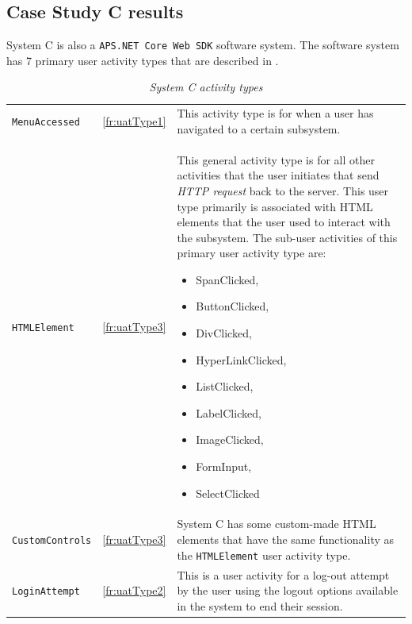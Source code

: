 \clearpage

\subsection{Case Study C results}\label{sec:ch3_csC}
System C is also a \texttt{APS.NET Core Web SDK} software system. The software system has 7 primary user activity types that are described in .

\begin{table}[!htb]
	\centering
	\caption[System A activity types]{\textit{System C activity types}}
	\label{tbl:ch3_systemCActivityTypes}
	\begin{tabularx}{\textwidth}{llX}
		\toprule
		\thead{Activity} & \thead{Functional requirement} & \thead{Description} \\
		\midrule
		\rowcolor{lightgray}
		\texttt{MenuAccessed} & \ref{fr:uatType1} & \RaggedRight This activity type is for when a user has navigated to a certain subsystem. \\ 
		\texttt{HTMLElement} & \ref{fr:uatType3} & \RaggedRight This general activity type is for all other activities that the user initiates that send \textit{HTTP request} back to the server. This user type primarily is associated with HTML elements that the user used to interact with the subsystem. The sub-user activities of this primary user activity type are: \begin{itemize}
			\item SpanClicked,
			\item ButtonClicked, 
			\item DivClicked, 
			\item HyperLinkClicked,
			\item ListClicked, 
			\item LabelClicked, 
			\item ImageClicked, 
			\item FormInput, 
			\item SelectClicked
		\end{itemize} \\
		\rowcolor{lightgray}
		\texttt{CustomControls} & \ref{fr:uatType3} & \RaggedRight System C has some custom-made HTML elements that have the same functionality as the \texttt{HTMLElement} user activity type. \\ 
		\texttt{LoginAttempt} & \ref{fr:uatType2} & \RaggedRight This is a user activity for a log-out attempt by the user using the logout options available in the system to end their session. \\ 

\end{tabularx}
\end{table}
